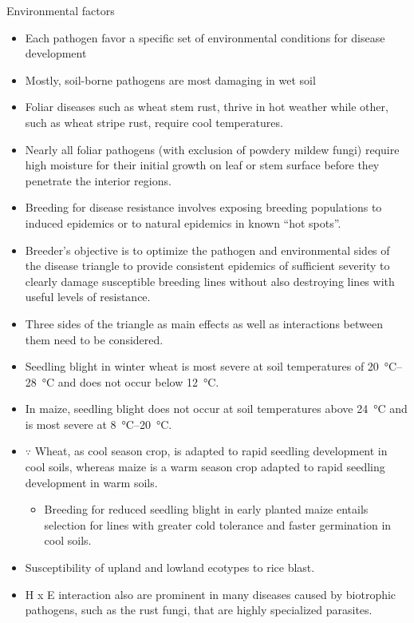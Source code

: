 \documentclass[11pt,dvipsnames,ignorenonframetext,aspectratio=169]{beamer}
\providecommand{\tightlist}{%
  \setlength{\itemsep}{0pt}\setlength{\parskip}{0pt}}
\begin{document}
\begin{frame}{Environmental factors}
\protect\hypertarget{environmental-factors}{}
\small

\begin{itemize}
\tightlist
\item
  Each pathogen favor a specific set of environmental conditions for
  disease development
\item
  Mostly, soil-borne pathogens are most damaging in wet soil
\item
  Foliar diseases such as wheat stem rust, thrive in hot weather while
  other, such as wheat stripe rust, require cool temperatures.
\item
  Nearly all foliar pathogens (with exclusion of powdery mildew fungi)
  require high moisture for their initial growth on leaf or stem surface
  before they penetrate the interior regions.
\item
  Breeding for disease resistance involves exposing breeding populations
  to induced epidemics or to natural epidemics in known ``hot spots''.
\item
  Breeder's objective is to optimize the pathogen and environmental
  sides of the disease triangle to provide consistent epidemics of
  sufficient severity to clearly damage susceptible breeding lines
  without also destroying lines with useful levels of resistance.
\item
  Three sides of the triangle as main effects as well as interactions
  between them need to be considered.
\end{itemize}
\end{frame}

\begin{frame}{}
\protect\hypertarget{section-10}{}
\begin{itemize}
\tightlist
\item
  Seedling blight in winter wheat is most severe at soil temperatures of
  \SIrange{20}{28}{\celsius} and does not occur below \SI{12}{\celsius}.
\item
  In maize, seedling blight does not occur at soil temperatures above
  \SI{24}{\celsius} and is most severe at \SIrange{8}{20}{\celsius}.
\item
  \(\because\) Wheat, as cool season crop, is adapted to rapid seedling
  development in cool soils, whereas maize is a warm season crop adapted
  to rapid seedling development in warm soils.

  \begin{itemize}
  \tightlist
  \item
    Breeding for reduced seedling blight in early planted maize entails
    selection for lines with greater cold tolerance and faster
    germination in cool soils.
  \end{itemize}
\item
  Susceptibility of upland and lowland ecotypes to rice blast.
\item
  H x E interaction also are prominent in many diseases caused by
  biotrophic pathogens, such as the rust fungi, that are highly
  specialized parasites.
\end{itemize}
\end{frame}
\end{document}
